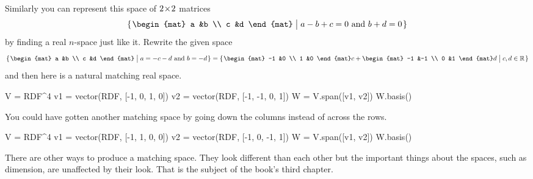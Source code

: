 Similarly you can represent this space of $2 \! \times \! 2$ matrices
\begin{equation*}
  \set{\begin{mat}
         a  &b \\
         c  &d
       \end{mat}\suchthat \text{$a-b+c=0$ and $b+d=0$}}
\end{equation*}
by finding a real $n$-space just like it.
Rewrite the given space
\begin{equation*}
  \set{\begin{mat}
         a  &b \\
         c  &d
       \end{mat}\suchthat \text{$a=-c-d$ and $b=-d$}}
  =\set{\begin{mat}
         -1  &0 \\
          1  &0
       \end{mat}c
       +
       \begin{mat}
         -1  &-1 \\
          0  &1
       \end{mat}d
       \suchthat c,d\in\Re}
\end{equation*}
and then here is a natural matching real space.
\begin{sageoutput}
V = RDF^4
v1 = vector(RDF, [-1, 0, 1, 0])
v2 = vector(RDF, [-1, -1, 0, 1])
W = V.span([v1, v2])
W.basis()
\end{sageoutput}
You could have gotten another matching space by going down the columns 
instead of across the rows.  
\begin{sageoutput}
V = RDF^4
v1 = vector(RDF, [-1, 1, 0, 0])
v2 = vector(RDF, [-1, 0, -1, 1])
W = V.span([v1, v2])
W.basis()
\end{sageoutput}
\noindent
There are other ways to produce a matching space.
They look different than each other
but the important things about the spaces, such as dimension, are 
unaffected by their look.
That is the subject of the book's third chapter.

\endinput


TODO:
